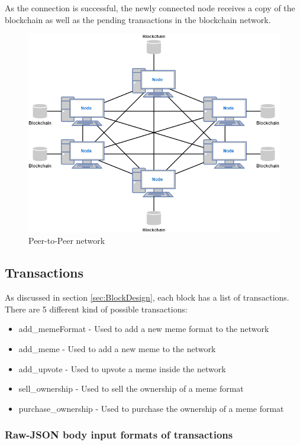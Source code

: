 \documentclass[12pt]{article}
\begin{document}
As the connection is successful, the newly connected node receives a copy of the blockchain as well as the pending transactions in the blockchain network.
\begin{figure}[H]
    \centering
    \includegraphics[width=12cm]{../report_MemeEcon/images/p2p.png}
    \caption{Peer-to-Peer network}
    \label{fig:P2P}
\end{figure}
\subsection{Transactions} %

As discussed in section \ref{sec:BlockDesign}, each block has a list of transactions. There are 5 different kind of possible transactions:
\begin{itemize}
  \item add\_memeFormat - Used to add a new meme format to the network
  \item add\_meme - Used to add a new meme to the network
  \item add\_upvote - Used to upvote a meme inside the network
  \item sell\_ownership - Used to sell the ownership of a meme format
  \item purchase\_ownership - Used to purchase the ownership of a meme format
\end{itemize}

\subsubsection{Raw-JSON body input formats of transactions}
\end{document}
